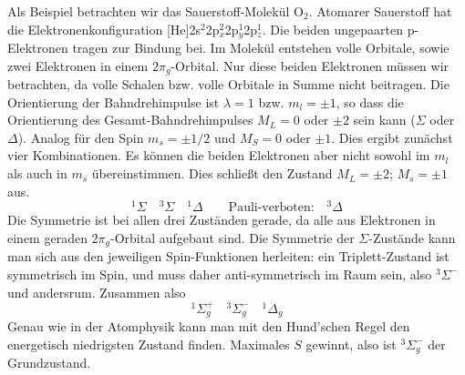 Als Beispiel betrachten wir das Sauerstoff-Molekül O$_2$. Atomarer Sauerstoff hat die Elektronenkonfiguration [He]2s$^2$2p$_x^2$2p$_y^1$2p$_z^1$. Die beiden ungepaarten p-Elektronen tragen zur Bindung bei. Im Molekül entstehen volle Orbitale, sowie zwei Elektronen in einem $2\pi_g$-Orbital. Nur diese beiden Elektronen müssen wir betrachten, da volle Schalen bzw. volle Orbitale in Summe nicht beitragen. Die Orientierung der  Bahndrehimpulse ist  $\lambda = 1$ bzw. $m_l = \pm 1$, so dass die Orientierung des Gesamt-Bahndrehimpulses $M_L = 0$ oder $\pm 2$ sein kann ($\Sigma$ oder $\Delta$). Analog für den Spin $m_s = \pm 1/2$ und $M_S = 0 $ oder $\pm 1$. Dies ergibt zunächst  vier  Kombinationen. Es können die beiden Elektronen aber nicht sowohl im $m_l$ als auch in $m_s$ übereinstimmen. Dies schließt den Zustand $M_L = \pm 2$; $M_s = \pm 1$ aus.
\begin{equation}
 ^1\Sigma \quad ^3\Sigma \quad ^1\Delta \qquad \text{Pauli-verboten:} \quad ^3\Delta  
\end{equation}
Die Symmetrie ist bei allen drei Zuständen gerade, da alle aus  Elektronen in einem geraden $2\pi_g$-Orbital aufgebaut sind. Die Symmetrie der $\Sigma$-Zustände kann man sich aus den jeweiligen Spin-Funktionen herleiten: ein Triplett-Zustand ist symmetrisch im Spin, und muss daher anti-symmetrisch im Raum sein, also $^3\Sigma^-$ und andersrum. Zusammen also
\begin{equation}
 ^1\Sigma_g^+ \quad ^3\Sigma_g^- \quad ^1\Delta _g
\end{equation}
Genau wie in der Atomphysik kann man mit den Hund'schen Regel den energetisch niedrigsten Zustand finden. Maximales $S$ gewinnt, also ist $^3\Sigma_g^- $ der Grundzustand.


\printbibliography[segment=\therefsegment,heading=subbibliography]

